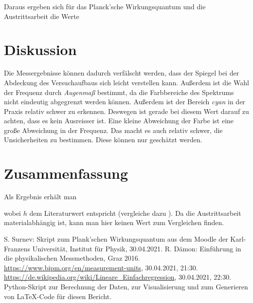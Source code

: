 \documentclass{article}
\begin{document}
Daraus ergeben sich für das Planck'sche Wirkungsquantum und die Austrittsarbeit die Werte





\section{Diskussion}

Die Messergebnisse können dadurch verfälscht werden, dass der Spiegel bei der Abdeckung des Versuchaufbaus sich leicht verstellen kann. Außerdem ist die Wahl der Frequenz durch \textit{Augenmaß} bestimmt, da die Farbbereiche des Spektrums nicht eindeutig abgegrenzt werden können. Außerdem ist der Bereich \textit{cyan} in der Praxis relativ schwer zu erkennen. Deswegen ist gerade bei diesem Wert darauf zu achten, dass es kein Ausreisser ist. Eine kleine Abweichung der Farbe ist eine große Abweichung in der Frequenz. Das macht es auch relativ schwer, die Unsicherheiten zu bestimmen. Diese können nur geschätzt werden.

\section{Zusammenfassung}

Als Ergebnis erhält man

wobei $h$ dem Literaturwert entspricht (vergleiche dazu \cite{wikipedia}). Da die Austrittsarbeit materialabhängig ist, kann man hier keinen Wert zum Vergleichen finden.


\begin{thebibliography}{9}
 S. Surnev: Skript zum Plank'schen Wirkungsquantum aus dem Moodle der Karl-Franzens Universität, Institut für Physik, 30.04.2021.
  R. Dämon: Einführung in die physikalischen Messmethoden, Graz 2016.
 \url{https://www.bipm.org/en/measurement-units}, 30.04.2021, 21:30.
 \url{https://de.wikipedia.org/wiki/Lineare_Einfachregression}, 30.04.2021, 22:30.
 Python-Skript zur Berechnung der Daten, zur Visualisierung und zum Generieren von \LaTeX-Code für diesen Bericht.
\end{thebibliography}


\newpage 



\end{document}

